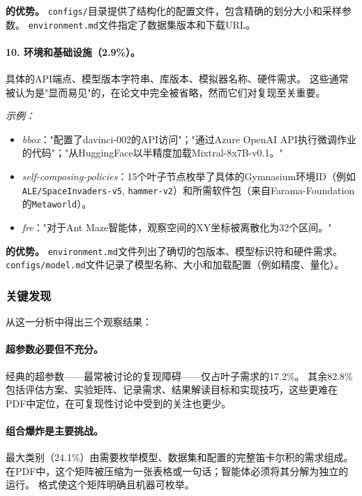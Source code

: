 \noindent\textbf{\ara{}的优势。}
\texttt{configs/}目录提供了结构化的配置文件，包含精确的划分大小和采样参数。
\texttt{environment.md}文件指定了数据集版本和下载URL。

\paragraph{10. 环境和基础设施（2.9\%）。}
具体的API端点、模型版本字符串、库版本、模拟器名称、硬件需求。
这些通常被认为是"显而易见"的，在论文中完全被省略，然而它们对复现至关重要。

\emph{示例：}
\begin{itemize}[leftmargin=*, itemsep=1pt]
  \item \emph{bbox}："配置了davinci-002的API访问"；"通过Azure OpenAI API执行微调作业的代码"；"从HuggingFace以半精度加载Mixtral-8x7B-v0.1。"
  \item \emph{self-composing-policies}：15个叶子节点枚举了具体的Gymnasium环境ID（例如\texttt{ALE/SpaceInvaders-v5}, \texttt{hammer-v2}）和所需软件包（来自Farama-Foundation的\texttt{Metaworld}）。
  \item \emph{fre}："对于Ant Maze智能体，观察空间的XY坐标被离散化为32个区间。"
\end{itemize}

\noindent\textbf{\ara{}的优势。}
\texttt{environment.md}文件列出了确切的包版本、模型标识符和硬件需求。
\texttt{configs/model.md}文件记录了模型名称、大小和加载配置（例如精度、量化）。

\subsubsection{关键发现}

从这一分析中得出三个观察结果：

\paragraph{超参数必要但不充分。}
经典的超参数——最常被讨论的复现障碍——仅占叶子需求的17.2\%。
其余82.8\%包括评估方案、实验矩阵、记录需求、结果解读目标和实现技巧，这些更难在PDF中定位，在可复现性讨论中受到的关注也更少。

\paragraph{组合爆炸是主要挑战。}
最大类别（24.1\%）由需要枚举模型、数据集和配置的完整笛卡尔积的需求组成。
在PDF中，这个矩阵被压缩为一张表格或一句话；智能体必须将其分解为独立的运行。
\ara{}格式使这个矩阵明确且机器可枚举。

